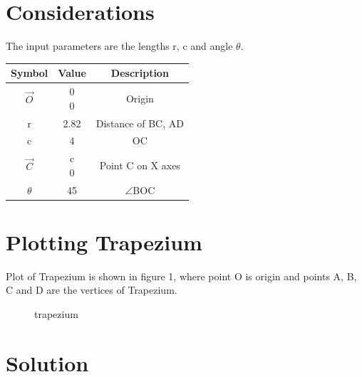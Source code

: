\documentclass[journal,10pt,twocolumn]{article}
\begin{document}
\section{Considerations}
\vspace{0.2cm}
The input parameters are the lengths r, c and angle $\theta$. \\
\vspace{0.2cm}
{


\setlength\extrarowheight{2pt}
\begin{tabular}{|c|c|c|}
	\hline
	\textbf{Symbol}&\textbf{Value}&\textbf{Description}\\
	\hline
	$\vec{O}$ & \myvec{0\\0}
	&Origin\\
	\hline
	r&2.82& Distance of BC, AD\\
	\hline
	c&4&OC\\
	
	\hline
	$\vec{C}$ & \myvec{c \\ 0}

	&Point C on X axes
	\\
\hline
	$\theta$&45 \textdegree &$\angle$BOC\\
	\hline
\end{tabular}
}


\section{Plotting Trapezium}




\vspace{0.25cm}
Plot of Trapezium is shown in figure 1, where point O is origin and points A, B, C and D are the vertices of Trapezium.
\begin{figure}[h]

\caption{trapezium}
\label{fig:trapezium}
\end{figure}


\section{Solution}

\vspace{0.25cm}
\end{document}

